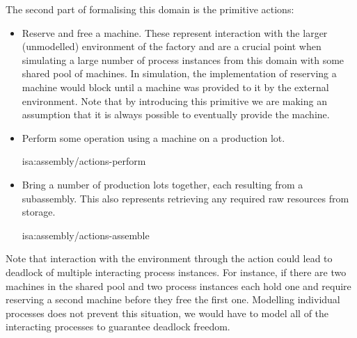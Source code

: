 \documentclass[class=smolathesis,crop=false]{standalone}
\begin{document}
The second part of formalising this domain is the primitive actions:
\begin{itemize}
  \item Reserve and free a machine.
    These represent interaction with the larger (unmodelled) environment of the factory and are a crucial point when simulating a large number of process instances from this domain with some shared pool of machines.
    In simulation, the implementation of reserving a machine would block until a machine was provided to it by the external environment.
    Note that by introducing this primitive we are making an assumption that it is always possible to eventually provide the machine.
  \item Perform some operation using a machine on a production lot.
    \begin{isadef}{isa:assembly/actions-perform}
      
    \end{isadef}
  \item Bring a number of production lots together, each resulting from a subassembly.
    This also represents retrieving any required raw resources from storage.\footnotemark
    \begin{isadef}{isa:assembly/actions-assemble}
      
    \end{isadef}
\end{itemize}


Note that interaction with the environment through the  action could lead to deadlock of multiple interacting process instances.
For instance, if there are two machines in the shared pool and two process instances each hold one and require reserving a second machine before they free the first one.
Modelling individual processes does not prevent this situation, we would have to model all of the interacting processes to guarantee deadlock freedom.
\end{document}
